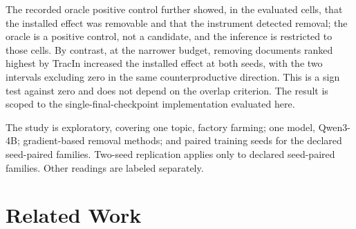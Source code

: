 \documentclass[10pt]{article}
\begin{document}
The recorded oracle positive control further showed, in the evaluated cells, that the installed effect was removable and that the instrument detected removal; the oracle is a positive control, not a candidate, and the inference is restricted to those cells. By contrast, at the narrower budget, removing documents ranked highest by TracIn increased the installed effect at both seeds, with the two intervals excluding zero in the same counterproductive direction. This is a sign test against zero and does not depend on the overlap criterion. The result is scoped to the single-final-checkpoint implementation evaluated here.



The study is exploratory, covering one topic, factory farming; one model, Qwen3-4B; gradient-based removal methods; and paired training seeds for the declared seed-paired families. Two-seed replication applies only to declared seed-paired families. Other readings are labeled separately.





\section{Related Work}
\label{sec:related_work}
\end{document}
